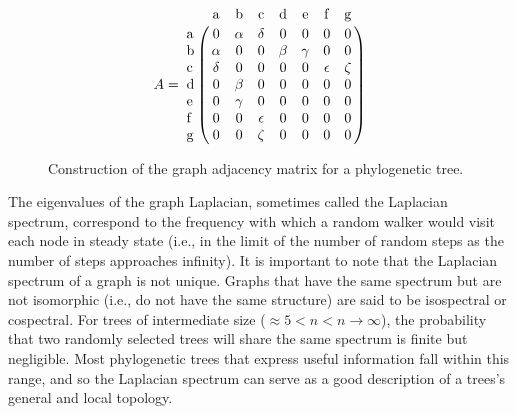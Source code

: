 \begin{figure}
\centering
\begin{subfigure}[t]{0.40\textwidth}
\begin{minipage}{0.40\textwidth}
\end{minipage}
\end{subfigure}
\begin{subfigure}[t]{0.40\textwidth}
\begin{minipage}{0.40\textwidth}
\begin{equation*}
A =
\bordermatrix{
           & \mathrm{a} & \mathrm{b} & \mathrm{c} & \mathrm{d} & \mathrm{e} & \mathrm{f} & \mathrm{g} \cr
\mathrm{a} & 0          & \alpha     & \delta     & 0          & 0          & 0          & 0          \cr
\mathrm{b} & \alpha     & 0          & 0          & \beta      & \gamma     & 0          & 0          \cr
\mathrm{c} & \delta     & 0          & 0          & 0          & 0          & \epsilon   & \zeta      \cr
\mathrm{d} & 0          & \beta      & 0          & 0          & 0          & 0          & 0          \cr
\mathrm{e} & 0          & \gamma     & 0          & 0          & 0          & 0          & 0          \cr
\mathrm{f} & 0          & 0          & \epsilon   & 0          & 0          & 0          & 0          \cr
\mathrm{g} & 0          & 0          & \zeta      & 0          & 0          & 0          & 0          \cr
}
\end{equation*}
\end{minipage}
\end{subfigure}
\caption{Construction of the graph adjacency matrix for a phylogenetic tree.}
\label{FP_adjacency}
\end{figure}

The eigenvalues of the graph Laplacian, sometimes called the Laplacian spectrum, correspond to the frequency with which a random walker would visit each node in steady state (i.e., in the limit of the number of random steps as the number of steps approaches infinity). It is important to note that the Laplacian spectrum of a graph is not unique. Graphs that have the same spectrum but are not isomorphic (i.e., do not have the same structure) are said to be isospectral or cospectral. For trees of intermediate size ($ \approx 5 < n < n \rightarrow \infty$), the probability that two randomly selected trees will share the same spectrum is finite but negligible. \cite{matsen2012ubiquity} Most phylogenetic trees that express useful information fall within this range, and so the Laplacian spectrum can serve as a good description of a trees's general and local topology.


